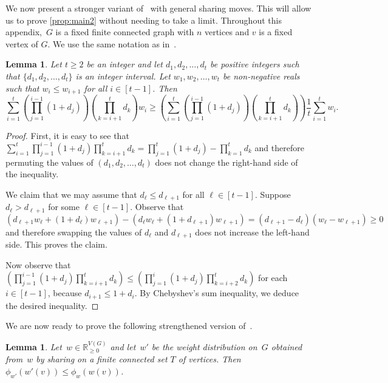 \documentclass[reqno, 12pt]{amsart}
\numberwithin{equation}{section}
\numberwithin{figure}{section}
\theoremstyle{plain}
\newtheorem{lem}[thm]{Lemma}
\theoremstyle{definition}
\newcommand*{\weights}{\ensuremath{\mathbb{R}_{\geq 0}^{V(G)}}}
\begin{document}
We now present a stronger variant of~ with general sharing moves.
This will allow us to prove \cref{prop:main2} without needing to take a limit. 
Throughout this appendix,~$G$ is a fixed finite connected graph with $n$ vertices and $v$ is a fixed vertex of $G$. We use the same notation as in~.


\begin{lem}
    \label{lem-ineq}
    Let $t\ge2$ be an integer
    and 
    let $d_1,d_2,\ldots,d_t$ be positive integers such that $\{ d_1,d_2,\ldots,d_t\}$ is an integer interval. 
    Let $w_1,w_2,\ldots,w_t$ be non-negative reals such that 
    $w_i\le w_{i+1}$ for all $i\in [t-1]$.
    Then
    \[ 
    \sum_{i=1}^t \left(\prod_{j=1}^{i-1} (1+d_j)\right)\left( \prod_{k=i+1}^t d_k\right)w_i
    \ge \left( \sum_{i=1}^t \left(\prod_{j=1}^{i-1} (1+d_j)\right)\left( \prod_{k=i+1}^t d_k\right)\right)\frac1t \sum_{i=1}^t w_i .
    \] 
\end{lem}
\begin{proof}
    First, it is easy to see that 
    $\sum_{i=1}^t \prod_{j=1}^{i-1} (1+d_j) \prod_{k=i+1}^t d_k= \prod_{j=1}^t (1+d_j)-\prod_{k=1}^t d_k$
    and therefore permuting the values of $(d_1,d_2,\ldots,d_t)$ does not change the right-hand side of the inequality.

    We claim that we may assume that $d_\ell\le d_{\ell+1}$ for all $\ell\in [t-1]$. Suppose $d_\ell>d_{\ell+1}$ for some $\ell\in [t-1]$. 
    Observe that 
    \[ 
    (d_{\ell+1}w_\ell + (1+d_\ell)w_{\ell+1} )
    -(d_{\ell}w_\ell + (1+d_{\ell+1})w_{\ell+1})
    = (d_{\ell+1}-d_\ell)(w_\ell -w_{\ell+1})\ge 0
    \] 
    and therefore swapping the values of $d_\ell$ and $d_{\ell+1}$ does not increase the left-hand side.
    This proves the claim.

    Now observe that 
    $\left(\prod_{j=1}^{i-1} (1+d_j) \prod_{k=i+1}^t d_k\right) \le \left(\prod_{j=1}^{i} (1+d_j) \prod_{k=i+2}^t d_k\right)$ for each $i\in[t-1]$, 
    because $d_{i+1}\le 1+d_i$.
    By Chebyshev's sum inequality, we deduce the desired inequality.
\end{proof}
We are now ready to prove the following strengthened version of~.

\begin{lem} \label{lem:strongphi}
    Let~${w \in \weights}$ and let~$w'$ be the weight distribution on~$G$ obtained from~$w$ by sharing on a finite connected set $T$ of vertices.
    Then~${\phi_{w'}(w'(v)) \leq \phi_{w}(w(v))}$. 
\end{lem}
\end{document}
